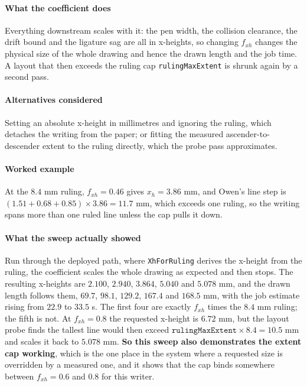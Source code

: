 \paragraph{What the coefficient does}

Everything downstream scales with it: the pen width, the collision clearance, the drift bound and the ligature sag are all in x-heights, so changing $f_{xh}$ changes the physical size of the whole drawing and hence the drawn length and the job time. A layout that then exceeds the ruling cap \texttt{rulingMaxExtent} is shrunk again by a second pass.

\paragraph{Alternatives considered}

Setting an absolute x-height in millimetres and ignoring the ruling, which detaches the writing from the paper; or fitting the measured ascender-to-descender extent to the ruling directly, which the probe pass approximates.

\paragraph{Worked example}

At the $8.4$ mm ruling, $f_{xh} = 0.46$ gives $x_h = 3.86$ mm, and Owen's line step is $(1.51+0.68+0.85) \times 3.86 = 11.7$ mm, which exceeds one ruling, so the writing spans more than one ruled line unless the cap pulls it down.

\paragraph{What the sweep actually showed}

Run through the deployed path, where \texttt{XhForRuling} derives the x-height from the ruling, the coefficient scales the whole drawing as expected and then stops. The resulting x-heights are $2.100$, $2.940$, $3.864$, $5.040$ and $5.078$ mm, and the drawn length follows them, $69.7$, $98.1$, $129.2$, $167.4$ and $168.5$ mm, with the job estimate rising from $22.9$ to $33.5$ s. The first four are exactly $f_{xh}$ times the $8.4$ mm ruling; the fifth is not. At $f_{xh} = 0.8$ the requested x-height is $6.72$ mm, but the layout probe finds the tallest line would then exceed $\texttt{rulingMaxExtent} \times 8.4 = 10.5$ mm and scales it back to $5.078$ mm. \textbf{So this sweep also demonstrates the extent cap working}, which is the one place in the system where a requested size is overridden by a measured one, and it shows that the cap binds somewhere between $f_{xh} = 0.6$ and $0.8$ for this writer.

